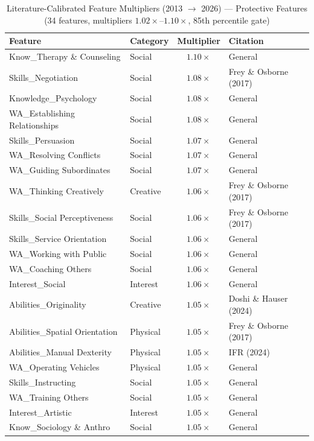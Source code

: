 \begin{table}[htbp]
\centering
\caption{Literature-Calibrated Feature Multipliers (2013 $\to$ 2026) --- Protective Features (34 features, multipliers $1.02\times$--$1.10\times$, 85th percentile gate)}
\label{tab:protective_multipliers}
\small
\begin{tabular}{llcl}
\toprule
\textbf{Feature} & \textbf{Category} & \textbf{Multiplier} & \textbf{Citation} \\
\midrule
Know\_Therapy \& Counseling & Social & $1.10\times$ & General \\
Skills\_Negotiation & Social & $1.08\times$ & Frey \& Osborne (2017) \\
Knowledge\_Psychology & Social & $1.08\times$ & General \\
WA\_Establishing Relationships & Social & $1.08\times$ & General \\
Skills\_Persuasion & Social & $1.07\times$ & General \\
WA\_Resolving Conflicts & Social & $1.07\times$ & General \\
WA\_Guiding Subordinates & Social & $1.07\times$ & General \\
WA\_Thinking Creatively & Creative & $1.06\times$ & Frey \& Osborne (2017) \\
Skills\_Social Perceptiveness & Social & $1.06\times$ & Frey \& Osborne (2017) \\
Skills\_Service Orientation & Social & $1.06\times$ & General \\
WA\_Working with Public & Social & $1.06\times$ & General \\
WA\_Coaching Others & Social & $1.06\times$ & General \\
Interest\_Social & Interest & $1.06\times$ & General \\
Abilities\_Originality & Creative & $1.05\times$ & Doshi \& Hauser (2024) \\
Abilities\_Spatial Orientation & Physical & $1.05\times$ & Frey \& Osborne (2017) \\
Abilities\_Manual Dexterity & Physical & $1.05\times$ & IFR (2024) \\
WA\_Operating Vehicles & Physical & $1.05\times$ & General \\
Skills\_Instructing & Social & $1.05\times$ & General \\
WA\_Training Others & Social & $1.05\times$ & General \\
Interest\_Artistic & Interest & $1.05\times$ & General \\
Know\_Sociology \& Anthro & Social & $1.05\times$ & General \\

\end{tabular}
\end{table}
